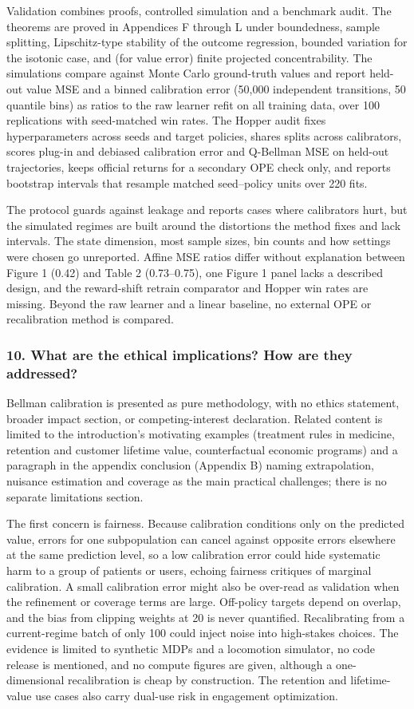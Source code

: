 \documentclass[11pt]{article}
\newcommand{\question}[1]{\subsubsection*{#1}}
\begin{document}
Validation combines proofs, controlled simulation and a benchmark audit. The theorems are proved in Appendices F through L under boundedness, sample splitting, Lipschitz-type stability of the outcome regression, bounded variation for the isotonic case, and (for value error) finite projected concentrability. The simulations compare against Monte Carlo ground-truth values and report held-out value MSE and a binned calibration error (50,000 independent transitions, 50 quantile bins) as ratios to the raw learner refit on all training data, over 100 replications with seed-matched win rates. The Hopper audit fixes hyperparameters across seeds and target policies, shares splits across calibrators, scores plug-in and debiased calibration error and Q-Bellman MSE on held-out trajectories, keeps official returns for a secondary OPE check only, and reports bootstrap intervals that resample matched seed--policy units over 220 fits.

The protocol guards against leakage and reports cases where calibrators hurt, but the simulated regimes are built around the distortions the method fixes and lack intervals. The state dimension, most sample sizes, bin counts and how settings were chosen go unreported. Affine MSE ratios differ without explanation between Figure 1 (0.42) and Table 2 (0.73--0.75), one Figure 1 panel lacks a described design, and the reward-shift retrain comparator and Hopper win rates are missing. Beyond the raw learner and a linear baseline, no external OPE or recalibration method is compared.

\question{10. What are the ethical implications? How are they addressed?}

Bellman calibration is presented as pure methodology, with no ethics statement, broader impact section, or competing-interest declaration. Related content is limited to the introduction's motivating examples (treatment rules in medicine, retention and customer lifetime value, counterfactual economic programs) and a paragraph in the appendix conclusion (Appendix B) naming extrapolation, nuisance estimation and coverage as the main practical challenges; there is no separate limitations section.

The first concern is fairness. Because calibration conditions only on the predicted value, errors for one subpopulation can cancel against opposite errors elsewhere at the same prediction level, so a low calibration error could hide systematic harm to a group of patients or users, echoing fairness critiques of marginal calibration. A small calibration error might also be over-read as validation when the refinement or coverage terms are large. Off-policy targets depend on overlap, and the bias from clipping weights at 20 is never quantified. Recalibrating from a current-regime batch of only 100 could inject noise into high-stakes choices. The evidence is limited to synthetic MDPs and a locomotion simulator, no code release is mentioned, and no compute figures are given, although a one-dimensional recalibration is cheap by construction. The retention and lifetime-value use cases also carry dual-use risk in engagement optimization.
\end{document}
